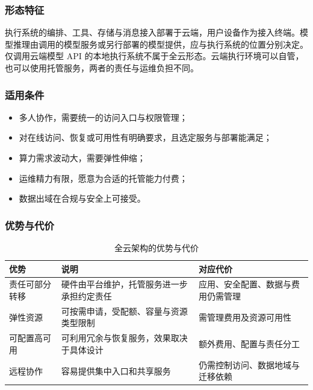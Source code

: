 \documentclass[11pt,a4paper]{article}
\begin{document}
\subsubsection{形态特征}

执行系统的编排、工具、存储与消息接入部署于云端，用户设备作为接入终端。模型推理由调用的模型服务或另行部署的模型提供，应与执行系统的位置分别决定。仅调用云端模型 API 的本地执行系统不属于全云形态。云端执行环境可以自管，也可以使用托管服务，两者的责任与运维负担不同。

\subsubsection{适用条件}

\begin{itemize}[leftmargin=2em,itemsep=2pt]
  \item 多人协作，需要统一的访问入口与权限管理；
  \item 对在线访问、恢复或可用性有明确要求，且选定服务与部署能满足；
  \item 算力需求波动大，需要弹性伸缩；
  \item 运维精力有限，愿意为合适的托管能力付费；
  \item 数据出域在合规与安全上可接受。
\end{itemize}

\subsubsection{优势与代价}

\begin{table}[H]
\centering
\renewcommand{\arraystretch}{1.4}
\begin{tabularx}{\textwidth}{P{3cm} P{5cm} L}
\toprule
\textbf{优势} & \textbf{说明} & \textbf{对应代价} \\
\midrule
责任可部分转移 & 硬件由平台维护，托管服务进一步承担约定责任 & 应用、安全配置、数据与费用仍需管理 \\
弹性资源 & 可按需申请，受配额、容量与资源类型限制 & 需管理费用及资源可用性 \\
可配置高可用 & 可利用冗余与恢复服务，效果取决于具体设计 & 额外费用、配置与责任分工 \\
远程协作 & 容易提供集中入口和共享服务 & 仍需控制访问、数据地域与迁移依赖 \\
\bottomrule
\end{tabularx}
\caption{全云架构的优势与代价}
\end{table}
\end{document}
